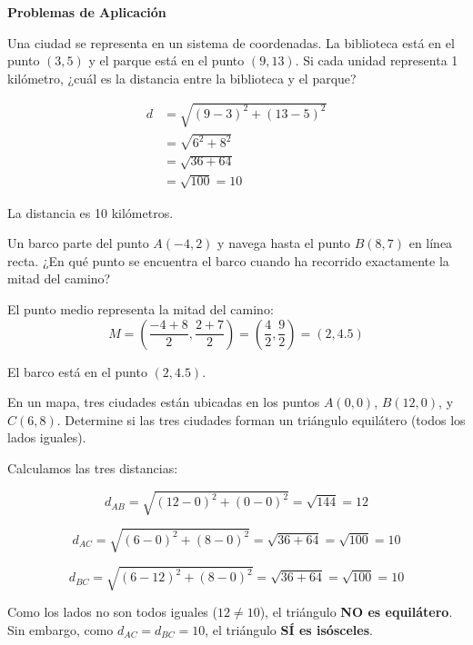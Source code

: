\begin{exercise}
\textbf{Problemas de Aplicación}

\problem Una ciudad se representa en un sistema de coordenadas. La biblioteca está en el punto $(3, 5)$ y el parque está en el punto $(9, 13)$. Si cada unidad representa 1 kilómetro, ¿cuál es la distancia entre la biblioteca y el parque?

\begin{solucion}
\begin{align*}
d &= \sqrt{(9-3)^2 + (13-5)^2} \\
  &= \sqrt{6^2 + 8^2} \\
  &= \sqrt{36 + 64} \\
  &= \sqrt{100} = 10
\end{align*}

La distancia es 10 kilómetros.
\end{solucion}

\problem Un barco parte del punto $A(-4, 2)$ y navega hasta el punto $B(8, 7)$ en línea recta. ¿En qué punto se encuentra el barco cuando ha recorrido exactamente la mitad del camino?

\begin{solucion}
El punto medio representa la mitad del camino:
$$M = \left(\frac{-4+8}{2}, \frac{2+7}{2}\right) = \left(\frac{4}{2}, \frac{9}{2}\right) = \left(2, 4.5\right)$$

El barco está en el punto $(2, 4.5)$.
\end{solucion}

\problem En un mapa, tres ciudades están ubicadas en los puntos $A(0, 0)$, $B(12, 0)$, y $C(6, 8)$. Determine si las tres ciudades forman un triángulo equilátero (todos los lados iguales).

\begin{solucion}
Calculamos las tres distancias:

$$d_{AB} = \sqrt{(12-0)^2 + (0-0)^2} = \sqrt{144} = 12$$

$$d_{AC} = \sqrt{(6-0)^2 + (8-0)^2} = \sqrt{36+64} = \sqrt{100} = 10$$

$$d_{BC} = \sqrt{(6-12)^2 + (8-0)^2} = \sqrt{36+64} = \sqrt{100} = 10$$

Como los lados no son todos iguales ($12 \neq 10$), el triángulo \textbf{NO es equilátero}.
Sin embargo, como $d_{AC} = d_{BC} = 10$, el triángulo \textbf{SÍ es isósceles}.
\end{solucion}
\end{exercise}

